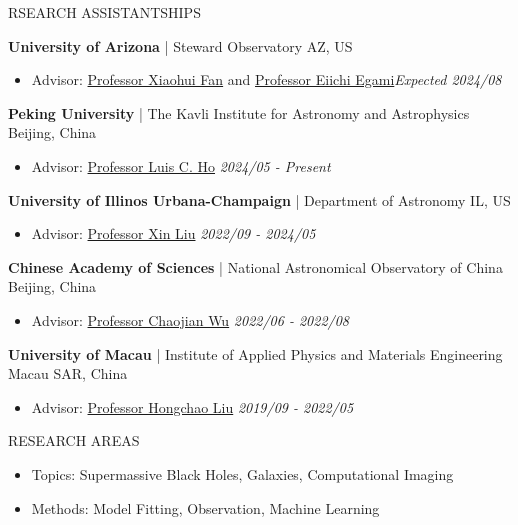 \documentclass[11pt]{article} %
\begin{document}
\begin{section}{RSEARCH ASSISTANTSHIPS}

\textbf{University of Arizona} | Steward Observatory \hfill AZ, US 
\begin{itemize}[leftmargin=1.5em]
\item Advisor: \href{mailto:xfan@arizona.edu}{Professor Xiaohui Fan} and \href{mailto:egami@arizona.edu}{Professor Eiichi Egami}\hfill \textit{Expected 2024/08}
\end{itemize}

\textbf{Peking University} | The Kavli Institute for Astronomy and Astrophysics \hfill Beijing, China 
\begin{itemize}[leftmargin=1.5em]
\item Advisor: \href{mailto:lho.pku@gmail.com}{Professor Luis C. Ho} \hfill \textit{2024/05 - Present}
\end{itemize}

\textbf{University of Illinos Urbana-Champaign} | Department of Astronomy \hfill IL, US 
\begin{itemize}[leftmargin=1.5em]
\item Advisor: \href{mailto:xinliuxl@illinois.edu}{Professor Xin Liu} \hfill \textit{2022/09 - 2024/05}
\end{itemize}

\textbf{Chinese Academy of Sciences} | National Astronomical Observatory of China \hfill Beijing, China 
\begin{itemize}[leftmargin=1.5em]
\item Advisor: \href{mailto:chjwu@bao.ac.cn}{Professor Chaojian Wu} \hfill \textit{2022/06 - 2022/08} 
\end{itemize}

\textbf{University of Macau} | Institute of Applied Physics and Materials Engineering \hfill Macau SAR, China
\begin{itemize}[leftmargin=1.5em]
\item Advisor: \href{mailto:hcliu@um.edu.mo}{Professor Hongchao Liu} \hfill \textit{2019/09 - 2022/05}
\end{itemize}

\end{section}

\begin{section}{RESEARCH AREAS}

\begin{itemize}[leftmargin=1.5em]
    \item Topics: Supermassive Black Holes, Galaxies, Computational Imaging
    \item Methods: Model Fitting, Observation, Machine Learning 
\end{itemize}

\end{section}
\end{document}
